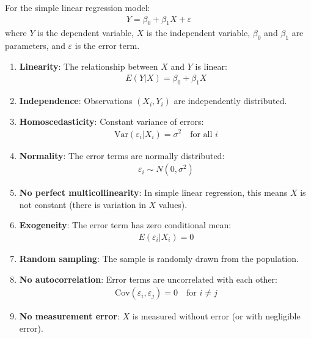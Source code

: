 \documentclass[12pt, xcolor=dvipsnames,svgnames,x11names]{article}
\begin{document}
\begin{answerbox}
For the simple linear regression model:
\begin{align*}
Y = \beta_0 + \beta_1 X + \varepsilon
\end{align*}
where $Y$ is the dependent variable, $X$ is the independent variable, $\beta_0$ and $\beta_1$ are parameters, and $\varepsilon$ is the error term.

\begin{enumerate}
    \item \textbf{Linearity}: The relationship between $X$ and $Y$ is linear:
    \begin{align*}
    E(Y|X) = \beta_0 + \beta_1 X
    \end{align*}
    
    \item \textbf{Independence}: Observations $(X_i, Y_i)$ are independently distributed.
    
    \item \textbf{Homoscedasticity}: Constant variance of errors:
    \begin{align*}
    \text{Var}(\varepsilon_i|X_i) = \sigma^2 \quad \text{for all } i
    \end{align*}
    
    \item \textbf{Normality}: The error terms are normally distributed:
    \begin{align*}
    \varepsilon_i \sim N(0, \sigma^2)
    \end{align*}
    
    \item \textbf{No perfect multicollinearity}: In simple linear regression, this means $X$ is not constant (there is variation in $X$ values).
    
    \item \textbf{Exogeneity}: The error term has zero conditional mean:
    \begin{align*}
    E(\varepsilon_i|X_i) = 0
    \end{align*}
    
    \item \textbf{Random sampling}: The sample is randomly drawn from the population.
    
    \item \textbf{No autocorrelation}: Error terms are uncorrelated with each other:
    \begin{align*}
    \text{Cov}(\varepsilon_i, \varepsilon_j) = 0 \quad \text{for } i \neq j
    \end{align*}
    
    \item \textbf{No measurement error}: $X$ is measured without error (or with negligible error).
\end{enumerate}

\end{answerbox}
\end{document}
